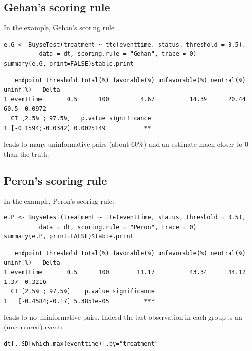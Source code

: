 \documentclass[12pt]{article}
\begin{document}
\subsection{Gehan's scoring rule}
\label{sec:orgdbc7980}
In the example, Gehan's scoring rule:
\lstset{language=r,label= ,caption= ,captionpos=b,numbers=none}
\begin{lstlisting}
e.G <- BuyseTest(treatment ~ tte(eventtime, status, threshold = 0.5),
          data = dt, scoring.rule = "Gehan", trace = 0)
summary(e.G, print=FALSE)$table.print
\end{lstlisting}

\begin{verbatim}
   endpoint threshold total(%) favorable(%) unfavorable(%) neutral(%) uninf(%)   Delta
1 eventtime       0.5      100         4.67          14.39      20.44     60.5 -0.0972
  CI [2.5% ; 97.5%]   p.value significance
1 [-0.1594;-0.0342] 0.0025149           **
\end{verbatim}


leads to many uninformative pairs (about 60\%) and an estimate much
closer to 0 than the truth.

\subsection{Peron's scoring rule}
\label{sec:org07a2f6a}
In the example, Peron's scoring rule:
\lstset{language=r,label= ,caption= ,captionpos=b,numbers=none}
\begin{lstlisting}
e.P <- BuyseTest(treatment ~ tte(eventtime, status, threshold = 0.5),
          data = dt, scoring.rule = "Peron", trace = 0)
summary(e.P, print=FALSE)$table.print
\end{lstlisting}

\begin{verbatim}
   endpoint threshold total(%) favorable(%) unfavorable(%) neutral(%) uninf(%)   Delta
1 eventtime       0.5      100        11.17          43.34      44.12     1.37 -0.3216
  CI [2.5% ; 97.5%]    p.value significance
1   [-0.4584;-0.17] 5.3851e-05          ***
\end{verbatim}

leads to no uninformative pairs. Indeed the last observation in each group is an (uncensored) event:
\lstset{language=r,label= ,caption= ,captionpos=b,numbers=none}
\begin{lstlisting}
dt[,.SD[which.max(eventtime)],by="treatment"]
\end{lstlisting}
\end{document}
